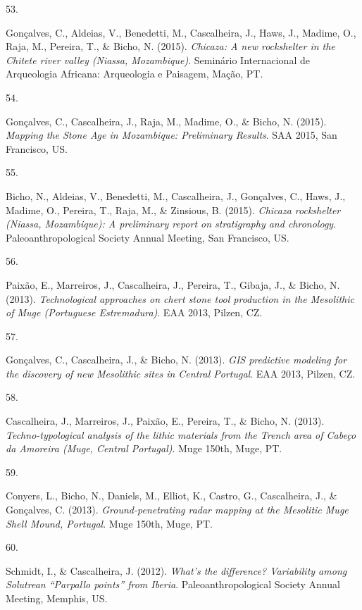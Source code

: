 \documentclass[11pt,a4paper,]{awesome-cv}
\newlength{\cslhangindent}
\newlength{\csllabelwidth}
\newenvironment{CSLReferences}[2] %
 {\begin{list}{}{%
  \setlength{\itemindent}{0pt}
  \setlength{\leftmargin}{0pt}
  \setlength{\parsep}{0pt}
  \ifodd #1
   \setlength{\leftmargin}{\cslhangindent}
   \setlength{\itemindent}{-1\cslhangindent}
  \fi
  \setlength{\itemsep}{#2\baselineskip}}}
 {\end{list}}
\newcommand{\CSLLeftMargin}[1]{\parbox[t]{\csllabelwidth}{\strut#1\strut}}
\newcommand{\CSLRightInline}[1]{\parbox[t]{\linewidth - \csllabelwidth}{\strut#1\strut}}
\begin{document}
\begin{CSLReferences}{0}{0}
\CSLLeftMargin{53. }%
\CSLRightInline{Gonçalves, C., Aldeias, V., Benedetti, M., Cascalheira,
J., Haws, J., Madime, O., Raja, M., Pereira, T., \& Bicho, N. (2015).
\emph{Chicaza: A new rockshelter in the Chitete river valley (Niassa,
Mozambique)}. Seminário Internacional de Arqueologia Africana:
Arqueologia e Paisagem, Mação, PT.}

\CSLLeftMargin{54. }%
\CSLRightInline{Gonçalves, C., Cascalheira, J., Raja, M., Madime, O., \&
Bicho, N. (2015). \emph{Mapping the Stone Age in Mozambique: Preliminary
Results}. SAA 2015, San Francisco, US.}

\CSLLeftMargin{55. }%
\CSLRightInline{Bicho, N., Aldeias, V., Benedetti, M., Cascalheira, J.,
Gonçalves, C., Haws, J., Madime, O., Pereira, T., Raja, M., \& Zinsious,
B. (2015). \emph{Chicaza rockshelter (Niassa, Mozambique): A preliminary
report on stratigraphy and chronology}. Paleoanthropological Society
Annual Meeting, San Francisco, US.}

\CSLLeftMargin{56. }%
\CSLRightInline{Paixão, E., Marreiros, J., Cascalheira, J., Pereira, T.,
Gibaja, J., \& Bicho, N. (2013). \emph{Technological approaches on chert
stone tool production in the Mesolithic of Muge (Portuguese
Estremadura)}. EAA 2013, Pilzen, CZ.}

\CSLLeftMargin{57. }%
\CSLRightInline{Gonçalves, C., Cascalheira, J., \& Bicho, N. (2013).
\emph{GIS predictive modeling for the discovery of new Mesolithic sites
in Central Portugal}. EAA 2013, Pilzen, CZ.}

\CSLLeftMargin{58. }%
\CSLRightInline{Cascalheira, J., Marreiros, J., Paixão, E., Pereira, T.,
\& Bicho, N. (2013). \emph{Techno-typological analysis of the lithic
materials from the Trench area of Cabeço da Amoreira (Muge, Central
Portugal)}. Muge 150th, Muge, PT.}

\CSLLeftMargin{59. }%
\CSLRightInline{Conyers, L., Bicho, N., Daniels, M., Elliot, K., Castro,
G., Cascalheira, J., \& Gonçalves, C. (2013). \emph{Ground-penetrating
radar mapping at the Mesolitic Muge Shell Mound, Portugal}. Muge 150th,
Muge, PT.}

\CSLLeftMargin{60. }%
\CSLRightInline{Schmidt, I., \& Cascalheira, J. (2012). \emph{What's the
difference? Variability among Solutrean {``Parpallo points''} from
Iberia}. Paleoanthropological Society Annual Meeting, Memphis, US.}


\end{CSLReferences}
\end{document}

